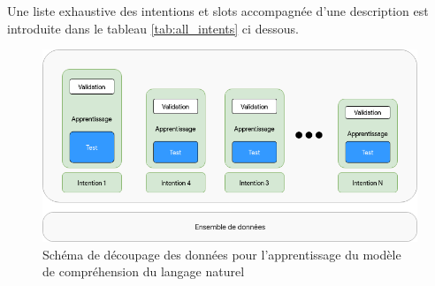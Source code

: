 	Une liste exhaustive des intentions et slots accompagnée d'une description est introduite dans le tableau \ref{tab:all_intents} ci dessous.
	\begin{figure}[H]
		\centering
		\includegraphics[width=.75\linewidth]{images/implementation/split.png} 
		\caption{Schéma de découpage des données pour l'apprentissage du modèle de compréhension du langage naturel} 
		\label{split}
	\end{figure}

